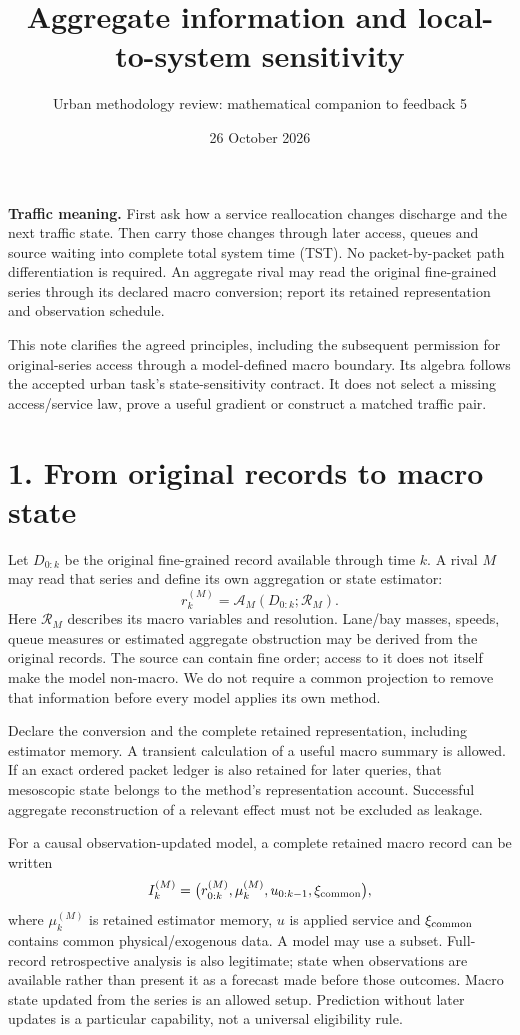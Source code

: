 \documentclass[11pt]{article}
\title{Aggregate information and local-to-system sensitivity}
\author{Urban methodology review: mathematical companion to feedback 5}
\date{26 October 2026}
\begin{document}
\maketitle

\textbf{Traffic meaning.} First ask how a service reallocation changes discharge and the next traffic state. Then carry those changes through later access, queues and source waiting into complete total system time (TST). No packet-by-packet path differentiation is required. An aggregate rival may read the original fine-grained series through its declared macro conversion; report its retained representation and observation schedule.

This note clarifies the agreed principles, including the subsequent permission for original-series access through a model-defined macro boundary. Its algebra follows the accepted urban task's state-sensitivity contract. It does not select a missing access/service law, prove a useful gradient or construct a matched traffic pair.

\section*{1. From original records to macro state}

Let $D_{0:k}$ be the original fine-grained record available through time $k$. A rival $M$ may read that series and define its own aggregation or state estimator:
\begin{equation}
 r_k^{(M)}=\mathcal A_M(D_{0:k};\mathcal R_M).
\end{equation}
Here $\mathcal R_M$ describes its macro variables and resolution. Lane/bay masses, speeds, queue measures or estimated aggregate obstruction may be derived from the original records. The source can contain fine order; access to it does not itself make the model non-macro. We do not require a common projection to remove that information before every model applies its own method.

Declare the conversion and the complete retained representation, including estimator memory. A transient calculation of a useful macro summary is allowed. If an exact ordered packet ledger is also retained for later queries, that mesoscopic state belongs to the method's representation account. Successful aggregate reconstruction of a relevant effect must not be excluded as leakage.

For a causal observation-updated model, a complete retained macro record can be written
\begin{equation}
 I_k^{(M)}=\bigl(r_{0:k}^{(M)},\mu_k^{(M)},u_{0:k-1},\xi_{\rm common}\bigr),
\end{equation}
where $\mu_k^{(M)}$ is retained estimator memory, $u$ is applied service and $\xi_{\rm common}$ contains common physical/exogenous data. A model may use a subset. Full-record retrospective analysis is also legitimate; state when observations are available rather than present it as a forecast made before those outcomes. Macro state updated from the series is an allowed setup. Prediction without later updates is a particular capability, not a universal eligibility rule.
\end{document}
